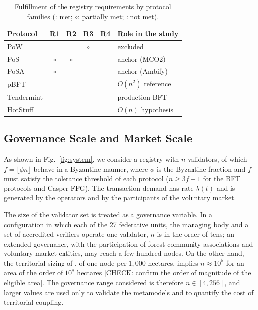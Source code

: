 \documentclass[english]{sbc2025}%
\newcommand{\chk}[1]{\textcolor{orange!80!black}{[CHECK: #1]}}
\newcommand{\cmark}{\ding{51}}
\newcommand{\xmark}{\ding{55}}
\begin{document}
\begin{table}[!ht]
\caption{Fulfillment of the registry requirements by protocol families (\cmark: met; $\circ$: partially met; \xmark: not met).}
\label{tab:req}
\centering
\footnotesize
\setlength{\tabcolsep}{3pt}
\begin{tabular}{@{}lccccl@{}}
\hline\hline
Protocol & R1 & R2 & R3 & R4 & Role in the study \\
\hline
PoW        & \xmark  & \xmark  & $\circ$ & \xmark & excluded \\
PoS        & $\circ$ & $\circ$ & \cmark  & \cmark & anchor (MCO2) \\
PoSA       & $\circ$ & \cmark  & \cmark  & \cmark & anchor (Ambify) \\
pBFT       & \cmark  & \cmark  & \cmark  & \cmark & $O(n^2)$ reference \\
Tendermint & \cmark  & \cmark  & \cmark  & \cmark & production BFT \\
HotStuff   & \cmark  & \cmark  & \cmark  & \cmark & $O(n)$ hypothesis \\
\hline\hline
\end{tabular}
\end{table}

\subsection{Governance Scale and Market Scale}

As shown in Fig.~\ref{fig:system}, we consider a registry with $n$ validators, of which $f = \lfloor \phi n \rfloor$ behave in a Byzantine manner, where $\phi$ is the Byzantine fraction and $f$ must satisfy the tolerance threshold of each protocol ($n \geq 3f+1$ for the BFT protocols and Casper FFG). The transaction demand has rate $\lambda(t)$ and is generated by the operators and by the participants of the voluntary market.

The size of the validator set is treated as a governance variable. In a configuration in which each of the 27 federative units, the managing body and a set of accredited verifiers operate one validator, $n$ is in the order of tens; an extended governance, with the participation of forest community associations and voluntary market entities, may reach a few hundred nodes. On the other hand, the territorial sizing of \citep{Caburlao2026clei}, of one node per $1{,}000$ hectares, implies $n \approx 10^{5}$ for an area of the order of $10^{8}$ hectares \chk{confirm the order of magnitude of the eligible area}. The governance range considered is therefore $n \in [4, 256]$, and larger values are used only to validate the metamodels and to quantify the cost of territorial coupling.
\end{document}
